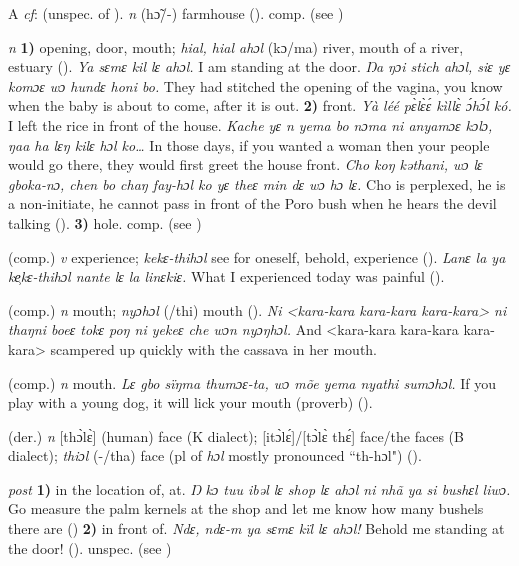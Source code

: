 \begin{letter}{A}
 \textit{cf}:  (unspec. of ). \textit{n} (hɔ̃/-) farmhouse (\citealt{Pichl1967}). comp.  (see ) 

 \textit{n} \textbf{1)} opening, door, mouth; \textit{hial, hial ahɔl} (kɔ/ma) river, mouth of a river, estuary (\citealt{Pichl1967}). \textit{Ya sɛmɛ kil lɛ ahɔl.} I am standing at the door. \textit{Ŋa ŋɔi stich ahɔl, siɛ yɛ komɔɛ wɔ hundɛ honi bo.} They had stitched the opening of the vagina, you know when the baby is about to come, after it is out. \textbf{2)} front. \textit{Yà léé pɛ̀lɛ̀ɛ́ kìllɛ̀ ɔ́hɔ́l kó.} I left the rice in front of the house. \textit{Kache yɛ n yema bo nɔma ni anyamɔɛ kɔlɔ, ŋaa ha lɛŋ kilɛ hɔl ko…} In those days, if you wanted a woman then your people would go there, they would first greet the house front. \textit{Cho koŋ kəthani, wɔ lɛ gboka-nɔ, chen bo chaŋ fay-hɔl ko yɛ theɛ min dɛ wɔ hɔ lɛ.} Cho is perplexed, he is a non-initiate, he cannot pass in front of the Poro bush when he hears the devil talking (\citealt{Pichl1967}). \textbf{3)} hole. comp.  (see ) 

 (comp.) \textit{v} experience; \textit{kekɛ-thihɔl} see for oneself, behold, experience (\citealt{Pichl1967}). \textit{Lanɛ la ya ke̹kɛ-thihɔl nante lɛ la linɛkiɛ.} What I experienced today was painful (\citealt{Pichl1967}).

 (comp.) \textit{n} mouth; \textit{nyɔhɔl} (/thi) mouth (\citealt{Sumner1921}). \textit{Ni <kara-kara kara-kara kara-kara> ni thaŋni boeɛ tokɛ poŋ ni yekeɛ che wɔn nyɔŋhɔl.} And <kara-kara kara-kara kara-kara> scampered up quickly with the cassava in her mouth.

 (comp.) \textit{n} mouth. \textit{Lɛ gbo sïŋma thumɔɛ-ta, wɔ mõe yema nyathi sumɔhɔl.} If you play with a young dog, it will lick your mouth (proverb) (\citealt{Pichl1967}). 

 (der.) \textit{n} [thɔ̀lɛ̀] (human) face (K dialect); [itɔ̀lɛ́]/[tɔ̀lɛ̀ thɛ́] face/the faces (B dialect); \textit{thiɔl} (-/tha) face (pl of \textit{hɔl} mostly pronounced “th-hɔl") (\citealt{Pichl1967}).

 \textit{post} \textbf{1)} in the location of, at. \textit{Ŋ kɔ tuu ibəl lɛ shop lɛ ahɔl ni nhã ya si bushɛl liwɔ.} Go measure the palm kernels at the shop and let me know how many bushels there are (\citealt{Pichl1967}) \textbf{2)} in front of. \textit{Ndɛ, ndɛ-m ya sɛmɛ kïl lɛ ahɔl!} Behold me standing at the door! (\citealt{Pichl1967}). unspec.  (see ) 


\end{letter}
